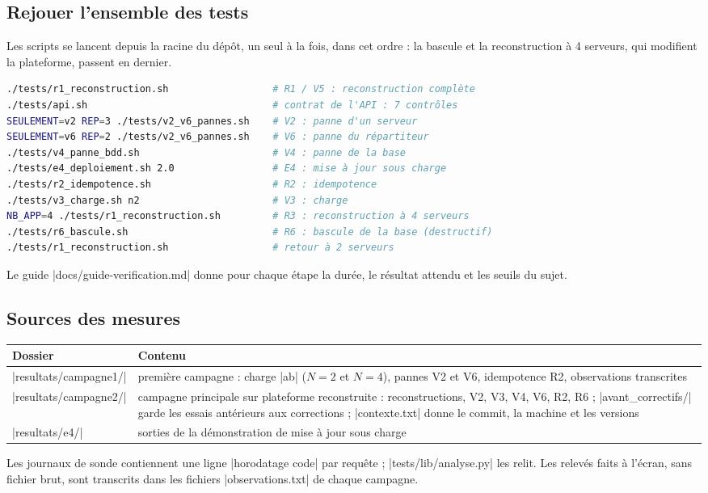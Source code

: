 \documentclass[a4paper,11pt]{article}
\begin{document}
\subsection{Rejouer l'ensemble des tests}
Les scripts se lancent depuis la racine du dépôt, un seul à la fois, dans cet ordre : la bascule et la reconstruction à 4 serveurs, qui modifient la plateforme, passent en dernier.
\begin{lstlisting}[language=bash]
./tests/r1_reconstruction.sh                  # R1 / V5 : reconstruction complète
./tests/api.sh                                # contrat de l'API : 7 contrôles
SEULEMENT=v2 REP=3 ./tests/v2_v6_pannes.sh    # V2 : panne d'un serveur
SEULEMENT=v6 REP=2 ./tests/v2_v6_pannes.sh    # V6 : panne du répartiteur
./tests/v4_panne_bdd.sh                       # V4 : panne de la base
./tests/e4_deploiement.sh 2.0                 # E4 : mise à jour sous charge
./tests/r2_idempotence.sh                     # R2 : idempotence
./tests/v3_charge.sh n2                       # V3 : charge
NB_APP=4 ./tests/r1_reconstruction.sh         # R3 : reconstruction à 4 serveurs
./tests/r6_bascule.sh                         # R6 : bascule de la base (destructif)
./tests/r1_reconstruction.sh                  # retour à 2 serveurs
\end{lstlisting}
Le guide |docs/guide-verification.md| donne pour chaque étape la durée, le résultat attendu et les seuils du sujet.

\subsection{Sources des mesures}
{\small
\begin{longtable}{@{}L{4.2cm}L{11.4cm}@{}}
\toprule
\textbf{Dossier} & \textbf{Contenu}\\ \midrule\endhead
|resultats/campagne1/| & première campagne : charge |ab| ($N=2$ et $N=4$), pannes V2 et V6, idempotence R2, observations transcrites\\
|resultats/campagne2/| & campagne principale sur plateforme reconstruite : reconstructions, V2, V3, V4, V6, R2, R6 ; |avant_correctifs/| garde les essais antérieurs aux corrections ; |contexte.txt| donne le commit, la machine et les versions\\
|resultats/e4/| & sorties de la démonstration de mise à jour sous charge\\
\bottomrule
\end{longtable}}
Les journaux de sonde contiennent une ligne |horodatage code| par requête ; |tests/lib/analyse.py| les relit. Les relevés faits à l'écran, sans fichier brut, sont transcrits dans les fichiers |observations.txt| de chaque campagne.
\end{document}
